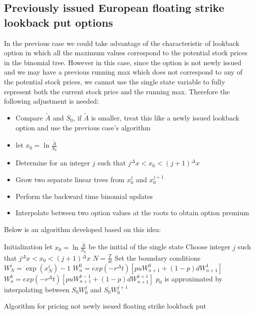 \subsection{Previously issued European floating strike lookback put options}
In the previous case we could take advantage of the characteristic of lookback option in which all the maximum values correspond to the potential stock prices in the binomial tree. However in this case, since the option is not newly issued and we may have a previous running max which does not correspond to any of the potential stock prices, we cannot use the single state variable to fully represent both the current stock price and the running max. Therefore the following adjustment is needed:
\begin{itemize}
	\item Compare $\tilde{A}$ and $S_{0}$, if $\tilde{A}$ is smaller, treat this like a newly issued lookback option and use the previous case's algorithm
	\item let $x_{0} = \ln \frac{\tilde{A}}{S_{0}}$
	\item Determine for an integer $j$ such that $j{^{\Delta}x} < x_{0} < (j+1){^{\Delta}x}$
	\item Grow two separate linear trees from $x_{0}^{j}$ and $x_{0}^{j+1}$
	\item Perform the backward time binomial updates
	\item Interpolate between two option values at the roots to obtain option premium
\end{itemize}
Below is an algorithm developed based on this idea:\\
\begin{algorithm}[H]
 Initialization\;
 let $x_{0} = \ln \frac{\tilde{A}}{S_{0}}$ be the initial  of the single state\;
 Choose integer $j$ such that $j{^{\Delta}x} < x_{0} < (j+1){^{\Delta}x}$\;
 $N = \frac{T}{\delta t}$\;
 Set the boundary conditions\;
  {
  $W_{N}^{i} = \exp(x_{N}^{i}) - 1$\;
 }
  {
   {
    $W_{n}^{0} = exp(-r{^{\Delta}t})[puW_{n+1}^{0}+(1-p)dW_{n+1}^{1}]$\;
  }
   {
    $W_{n}^{k} = exp(-r{^{\Delta}t})[puW_{n+1}^{k-1}+(1-p)dW_{n+1}^{k+1}]$\;
  }
 }
 $p_{0}$ is approximated by interpolating between $S_{0}W_{0}^{j}$ and $S_{0}W_{0}^{j+1}$\;
\caption{Algorithm for pricing not newly issued floating strike lookback put}
\end{algorithm}
\newpage

